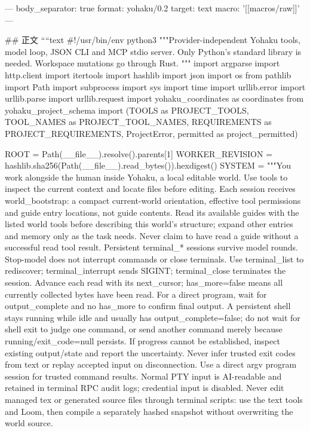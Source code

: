 ---
body_separator: true
format: yohaku/0.2
target: text
macro: '[[macros/raw]]'
---

## 正文
````text
#!/usr/bin/env python3
"""Provider-independent Yohaku tools, model loop, JSON CLI and MCP stdio server.
Only Python's standard library is needed. Workspace mutations go through Rust.
"""
import argparse
import http.client
import itertools
import hashlib
import json
import os
from pathlib import Path
import subprocess
import sys
import time
import urllib.error
import urllib.parse
import urllib.request
import yohaku_coordinates as coordinates
from yohaku_project_schema import (TOOLS as PROJECT_TOOLS, TOOL_NAMES as PROJECT_TOOL_NAMES,
    REQUIREMENTS as PROJECT_REQUIREMENTS, ProjectError, permitted as project_permitted)

ROOT = Path(__file__).resolve().parents[1]
WORKER_REVISION = hashlib.sha256(Path(__file__).read_bytes()).hexdigest()
SYSTEM = """You work alongside the human inside Yohaku, a local editable world.
Use tools to inspect the current context and locate files before editing.
Each session receives world_bootstrap: a compact current-world orientation,
effective tool permissions and guide entry locations, not guide contents.
Read its available guides with the listed world tools before describing this
world's structure; expand other entries and memory only as the task needs.
Never claim to have read a guide without a successful read tool result.
Persistent terminal_* sessions survive model rounds. Stop-model does not interrupt commands or close terminals. Use terminal_list to rediscover; terminal_interrupt sends SIGINT; terminal_close terminates the session. Advance each read with its next_cursor; has_more=false means all currently collected bytes have been read. For a direct program, wait for output_complete and no has_more to confirm final output. A persistent shell stays running while idle and usually has output_complete=false; do not wait for shell exit to judge one command, or send another command merely because running/exit_code=null persists. If progress cannot be established, inspect existing output/state and report the uncertainty. Never infer trusted exit codes from text or replay accepted input on disconnection. Use a direct argv program session for trusted command results. Normal PTY input is AI-readable and retained in terminal RPC audit logs; credential input is disabled. Never edit managed tex or generated source files through terminal scripts: use the text tools and Loom, then compile a separately hashed snapshot without overwriting the world source.

